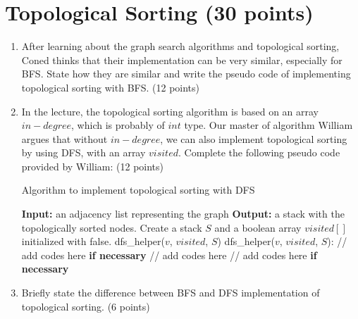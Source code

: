 \documentclass[11pt]{exam}
\begin{document}
\section{Topological Sorting (30 points)}
    \begin{enumerate}[1)]
        \item After learning about the graph search algorithms and topological sorting, Coned thinks that their implementation can be very similar, especially for BFS. State how they are similar and write the pseudo code of implementing topological sorting with BFS. (12 points)
        \begin{solution}
        \end{solution}
        \item In the lecture, the topological sorting algorithm is based on an array $in-degree$, which is probably of $int$ type. Our master of algorithm William argues that without $in-degree$, we can also implement topological sorting by using DFS, with an array $visited$. Complete the following pseudo code provided by William: (12 points)
        \begin{algorithm}[htbp]
            \caption{Algorithm to implement topological sorting with DFS}
            \begin{algorithmic}[1]
                \STATE \textbf{Input:} an adjacency list representing the graph
                \STATE \textbf{Output:} a stack with the topologically sorted nodes.
                \STATE Create a stack $S$ and a boolean array $visited[]$ initialized with false.
                    \STATE dfs\_helper($v$, $visited$, $S$)
                \ENDFOR
                \newline
                \newline
                \STATE dfs\_helper($v$, $visited$, $S$):
                \STATE // add codes here \textbf{if necessary}
                \newline
                \newline
                \newline
                \STATE // add codes here
                \newline
                \newline
                \newline
                \ENDFOR
                \STATE // add codes here \textbf{if necessary}
                \newline
                \newline
                \newline
            \end{algorithmic}
        \end{algorithm}
        \item Briefly state the difference between BFS and DFS implementation of topological sorting. (6 points)
        \begin{solution}
        \end{solution}
    \end{enumerate}
\end{document}

